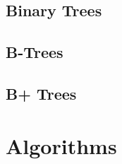 \documentclass[10pt,a4paper,titlepage]{book}
\begin{document}
\section{Binary Trees}

\vfill
\pagebreak
\section{B-Trees}

\vfill
\pagebreak
\section{B+ Trees}

\vfill
\pagebreak
\chapter{Algorithms}

\vfill
\pagebreak
\end{document}
